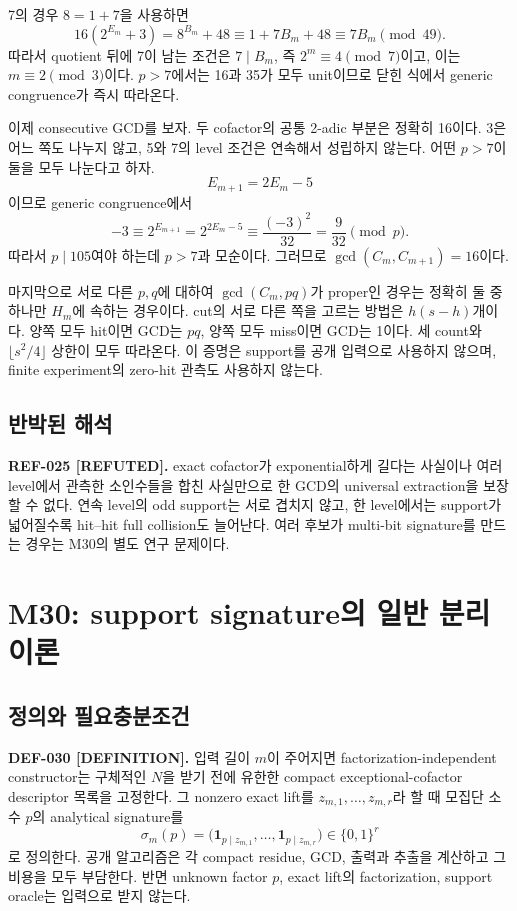 \documentclass[11pt]{article}
\begin{document}
7의 경우 \(8=1+7\)을 사용하면
\[
16(2^{E_m}+3)=8^{B_m}+48
\equiv1+7B_m+48
\equiv7B_m\pmod{49}.
\]
따라서 quotient 뒤에 7이 남는 조건은 \(7\mid B_m\), 즉
\(2^m\equiv4\pmod7\)이고, 이는 \(m\equiv2\pmod3\)이다. \(p>7\)에서는
16과 35가 모두 unit이므로 닫힌 식에서 generic congruence가 즉시
따라온다.

이제 consecutive GCD를 보자. 두 cofactor의 공통 2-adic 부분은
정확히 16이다. 3은 어느 쪽도 나누지 않고, 5와 7의 level 조건은
연속해서 성립하지 않는다. 어떤 \(p>7\)이 둘을 모두 나눈다고 하자.
\[
E_{m+1}=2E_m-5
\]
이므로 generic congruence에서
\[
-3\equiv2^{E_{m+1}}
=2^{2E_m-5}
\equiv\frac{(-3)^2}{32}
=\frac9{32}\pmod p.
\]
따라서 \(p\mid105\)여야 하는데 \(p>7\)과 모순이다. 그러므로
\(\gcd(C_m,C_{m+1})=16\)이다.

마지막으로 서로 다른 \(p,q\)에 대하여 \(\gcd(C_m,pq)\)가 proper인
경우는 정확히 둘 중 하나만 \(H_m\)에 속하는 경우이다. cut의 서로
다른 쪽을 고르는 방법은 \(h(s-h)\)개이다. 양쪽 모두 hit이면 GCD는
\(pq\), 양쪽 모두 miss이면 GCD는 1이다. 세 count와
\(\lfloor s^2/4\rfloor\) 상한이 모두 따라온다. 이 증명은 support를
공개 입력으로 사용하지 않으며, finite experiment의 zero-hit 관측도
사용하지 않는다.

\subsection{반박된 해석}

\textbf{REF-025 [REFUTED].}
exact cofactor가 exponential하게 길다는 사실이나 여러 level에서
관측한 소인수들을 합친 사실만으로 한 GCD의 universal extraction을
보장할 수 없다. 연속 level의 odd support는 서로 겹치지 않고, 한
level에서는 support가 넓어질수록 hit--hit full collision도 늘어난다.
여러 후보가 multi-bit signature를 만드는 경우는 M30의 별도
연구 문제이다.

\section{M30: support signature의 일반 분리 이론}

\subsection{정의와 필요충분조건}

\textbf{DEF-030 [DEFINITION].}
입력 길이 \(m\)이 주어지면 factorization-independent constructor는
구체적인 \(N\)을 받기 전에 유한한 compact exceptional-cofactor
descriptor 목록을 고정한다. 그 nonzero exact lift를
\(z_{m,1},\ldots,z_{m,r}\)라 할 때 모집단 소수 \(p\)의 analytical
signature를
\[
\sigma_m(p)=
\bigl(\mathbf1_{p\mid z_{m,1}},\ldots,
      \mathbf1_{p\mid z_{m,r}}\bigr)\in\{0,1\}^r
\]
로 정의한다. 공개 알고리즘은 각 compact residue, GCD, 출력과 추출을
계산하고 그 비용을 모두 부담한다. 반면 unknown factor \(p\), exact
lift의 factorization, support oracle는 입력으로 받지 않는다.
\end{document}
